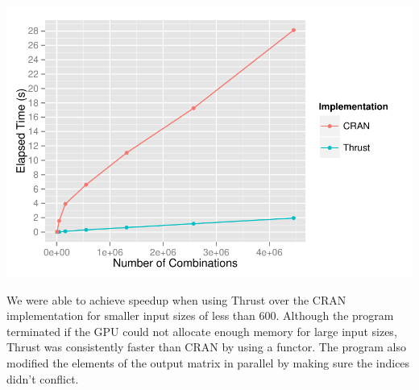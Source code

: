 \includegraphics{thrust.pdf}\\
\null

We were able to achieve speedup when using Thrust over the CRAN implementation for smaller input sizes of less than 600. Although the program terminated if the GPU could not allocate enough memory for large input sizes, Thrust was consistently faster than CRAN by using a functor. The program also modified the elements of the output matrix in parallel by making sure the indices didn't conflict. 
